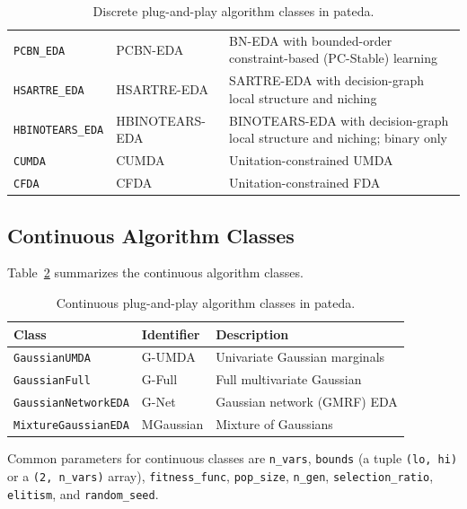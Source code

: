 \documentclass[a4paper,11pt]{article}
\begin{document}
\begin{table}[ht]
\begin{tabular}{llp{6.5cm}}
\texttt{PCBN\_EDA} & PCBN-EDA & BN-EDA with bounded-order constraint-based (PC-Stable) learning \citep{Colombo_and_Maathuis:2014} \\
\texttt{HSARTRE\_EDA} & HSARTRE-EDA & SARTRE-EDA with decision-graph local structure and niching \citep{Pelikan:2005} \\
\texttt{HBINOTEARS\_EDA} & HBINOTEARS-EDA & BINOTEARS-EDA with decision-graph local structure and niching; binary only \citep{Pelikan:2005} \\
\texttt{CUMDA} & CUMDA & Unitation-constrained UMDA \citep{Santana_and_Ochoa:1999b} \\
\texttt{CFDA} & CFDA & Unitation-constrained FDA \citep{Santana_et_al:2001c} \\
\bottomrule
\end{tabular}
\caption{Discrete plug-and-play algorithm classes in pateda.}
\label{tab:discrete_algs}
\end{table}

\subsection{Continuous Algorithm Classes}

Table~\ref{tab:continuous_algs} summarizes the continuous algorithm classes.

\begin{table}[ht]
\centering
\small
\setlength{\tabcolsep}{4pt}
\begin{tabular}{llp{7.5cm}}
\toprule
\textbf{Class} & \textbf{Identifier} & \textbf{Description} \\
\midrule
\texttt{GaussianUMDA} & G-UMDA & Univariate Gaussian marginals \citep{Larranhaga_et_al:1999,Larranhaga_et_al:2000} \\
\texttt{GaussianFull}  & G-Full & Full multivariate Gaussian \citep{Larranhaga_et_al:2000,Bosman_and_Thierens:2000} \\
\texttt{GaussianNetworkEDA} & G-Net & Gaussian network (GMRF) EDA \\
\texttt{MixtureGaussianEDA} & MGaussian & Mixture of Gaussians \citep{Bosman_and_Thierens:2002} \\
\bottomrule
\end{tabular}
\caption{Continuous plug-and-play algorithm classes in pateda.}
\label{tab:continuous_algs}
\end{table}

Common parameters for continuous classes are \texttt{n\_vars}, \texttt{bounds} (a tuple \texttt{(lo, hi)} or a \texttt{(2, n\_vars)} array),
\texttt{fitness\_func}, \texttt{pop\_size}, \texttt{n\_gen}, \texttt{selection\_ratio}, \texttt{elitism}, and \texttt{random\_seed}.
\end{document}
